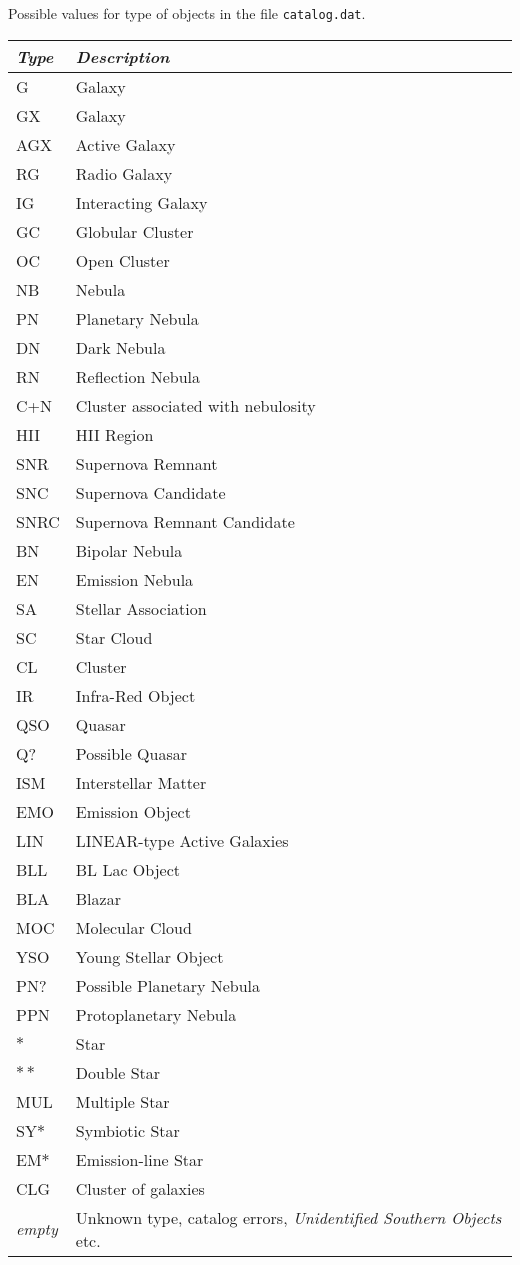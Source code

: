 Possible values for type of objects in the file \texttt{catalog.dat}.

\begin{longtable}{l|p{120mm}}
\toprule
\emph{Type} & \emph{Description}\\\midrule
G   & Galaxy\\
GX  & Galaxy\\
AGX & Active Galaxy\\
RG  & Radio Galaxy\\
IG  & Interacting Galaxy\\
GC  & Globular Cluster\\
OC  & Open Cluster\\
NB  & Nebula\\
PN  & Planetary Nebula\\
DN  & Dark Nebula\\
RN  & Reflection Nebula\\
C+N & Cluster associated with nebulosity\\
HII & HII Region\\
SNR & Supernova Remnant\\
SNC & Supernova Candidate\\
SNRC & Supernova Remnant Candidate\\
BN  & Bipolar Nebula\\
EN  & Emission Nebula\\
SA  & Stellar Association\\
SC  & Star Cloud\\
CL  & Cluster\\
IR  & Infra-Red Object\\
QSO & Quasar\\
Q?  & Possible Quasar\\
ISM & Interstellar Matter\\
EMO & Emission Object\\
LIN & LINEAR-type Active Galaxies\\
BLL & BL Lac Object\\
BLA & Blazar\\
MOC & Molecular Cloud\\
YSO & Young Stellar Object\\
PN? & Possible Planetary Nebula\\
PPN & Protoplanetary Nebula\\
$\ast$ & Star\\
$\ast\ast$ & Double Star\\
MUL & Multiple Star\\
SY$\ast$ & Symbiotic Star\\
EM$\ast$ & Emission-line Star\\
CLG & Cluster of galaxies\\
\emph{empty} & Unknown type, catalog errors, \emph{Unidentified Southern Objects} etc.\\
\bottomrule
\end{longtable}

